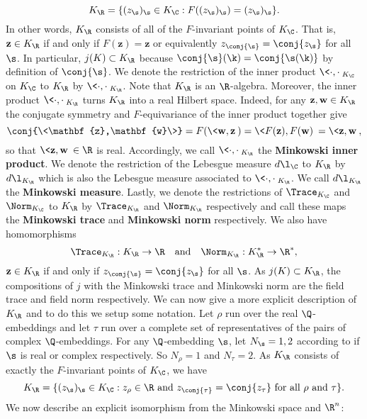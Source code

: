     \[
      K_{\R} = \{(z_{\s})_{\s} \in K_{\C}:F((z_{\s})_{\s}) = (z_{\s})_{\s}\}.
    \]
    In other words, $K_{\R}$ consists of all of the $F$-invariant points of $K_{\C}$. That is, $\mathbf{z} \in K_{\R}$ if and only if $F(\mathbf{z}) = \mathbf{z}$ or equivalently $z_{\conj{\s}} = \conj{z_{\s}}$ for all $\s$. In particular, $j(K) \subset K_{\R}$ because $\conj{\s}(\k) = \conj{\s(\k)}$ by definition of $\conj{\s}$. We denote the restriction of the inner product $\<\cdot,\cdot\>_{K_{\C}}$ on $K_{\C}$ to $K_{\R}$ by $\<\cdot,\cdot\>_{K_{\R}}$. Note that $K_{\R}$ is an $\R$-algebra. Moreover, the inner product $\<\cdot,\cdot\>_{K_{\R}}$ turns $K_{\R}$ into a real Hilbert space. Indeed, for any $\mathbf{z},\mathbf{w} \in K_{\R}$ the conjugate symmetry and $F$-equivariance of the inner product together give
    \[
      \conj{\<\mathbf{z},\mathbf{w}\>} = F(\<\mathbf{w},\mathbf{z}\>) = \<F(\mathbf{z}),F(\mathbf{w})\> = \<\mathbf{z},\mathbf{w}\>,
    \]
    so that $\<\mathbf{z},\mathbf{w}\> \in \R$ is real. Accordingly, we call $\<\cdot,\cdot\>_{K_{\R}}$ the \textbf{Minkowski inner product}. We denote the restriction of the Lebesgue measure $d\l_{\C}$ to $K_{\R}$ by $d\l_{K_{\R}}$ which is also the Lebesgue measure associated to $\<\cdot,\cdot\>_{K_{\R}}$. We call $d\l_{K_{\R}}$ the \textbf{Minkowski measure}. Lastly, we denote the restrictions of $\Trace_{K_{\C}}$ and $\Norm_{K_{\C}}$ to $K_{\R}$ by $\Trace_{K_{\R}}$ and $\Norm_{K_{\R}}$ respectively and call these maps the \textbf{Minkowski trace} and \textbf{Minkowski norm} respectively. We also have homomorphisms
    \[
      \Trace_{K_{\R}}:K_{\R} \to \R \quad \text{and} \quad \Norm_{K_{\R}}:K_{\R}^{\ast} \to \R^{\ast},
    \]
    $\mathbf{z} \in K_{\R}$ if and only if $z_{\conj{\s}} = \conj{z_{\s}}$ for all $\s$. As $j(K) \subset K_{\R}$, the compositions of $j$ with the Minkowski trace and Minkowski norm are the field trace and field norm respectively. We can now give a more explicit description of $K_{\R}$ and to do this we setup some notation. Let $\rho$ run over the real $\Q$-embeddings and let $\tau$ run over a complete set of representatives of the pairs of complex $\Q$-embeddings. For any $\Q$-embedding $\s$, let $N_{\s} = 1,2$ according to if $\s$ is real or complex respectively. So $N_{\rho} = 1$ and $N_{\tau} = 2$. As $K_{\R}$ consists of exactly the $F$-invariant points of $K_{\C}$, we have
    \[
      K_{\R} = \{(z_{\s})_{\s} \in K_{\C}:\text{$z_{\rho} \in \R$ and $z_{\conj{\tau}} = \conj{z_{\tau}}$ for all $\rho$ and $\tau$}\}.
    \]
    We now describe an explicit isomorphism from the Minkowski space and $\R^{n}$:
    

